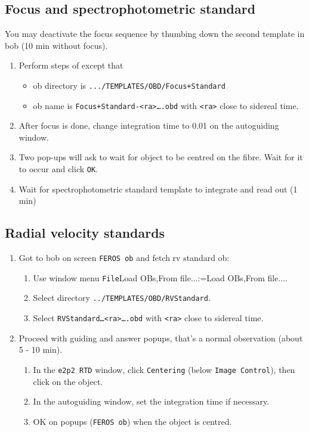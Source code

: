 \documentclass[11pt,fleqn,a4paper]{book}
\makeatletter
\def\menu#1#2{\texttt{#1}\ifx{}#2\else\@for\@x:=#2\do{$\rightarrow$\texttt{\@x}}\fi}
\def\wmenu#1#2{window menu \menu{#1}{#2}}
\def\fetchob{\wmenu{File}{Load OBs,From file...}}
\makeatother
\begin{document}
\subsection{Focus and spectrophotometric standard}

You may deactivate the \gls{focus} sequence by thumbing down the second \gls{template} in \gls{bob} (10 min without focus).

\begin{enumerate}
\item Perform steps of  except that
   \begin{itemize}
     \item \gls{ob} directory is \texttt{.../TEMPLATES/OBD/Focus+Standard}
     \item \gls{ob} name is \texttt{Focus+Standard-<ra>….obd} with \texttt{<ra>} close to sidereal time. 
   \end{itemize}
\item After \gls{focus} is done, change integration time to 0.01 on the \gls{autoguiding} window.
\item Two pop-ups will ask to wait for object to be centred on the fibre.  Wait for it to occur and click \texttt{OK}.
\item Wait for \gls{spectrophotometric standard} template to integrate and read out (1 min)
\end{enumerate}

\subsection{Radial velocity standards}

\begin{enumerate}
  \item Got to \gls{bob} on screen \texttt{FEROS \gls{ob}} and fetch \gls{rv standard} \gls{ob}:
  \begin{enumerate}
     \item Use \fetchob.
     \item Select directory \texttt{../TEMPLATES/OBD/RVStandard}.
     \item Select \texttt{RVStandard…<ra>….obd} with \texttt{<ra>} close to sidereal time.
  \end{enumerate}
  \item Proceed with guiding and answer popups, that's a normal observation (about 5 - 10 min).
  \begin{enumerate}
    \item In the \texttt{e2p2 RTD} window, click \texttt{Centering} (below \texttt{Image Control}), then click on the object.
    \item In the \gls{autoguiding} window, set the integration time if necessary.
    \item OK on popups (\texttt{FEROS \gls{ob}}) when the object is centred.
  \end{enumerate}  
    
\end{enumerate}
\end{document}
